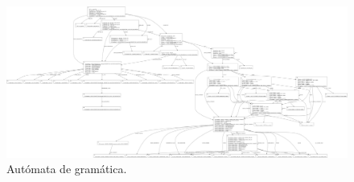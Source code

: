     
    

\begin{figure}
    \centering
    \includegraphics[scale=0.09]{images/automata.png}
    \caption{Autómata de gramática.}
\end{figure}